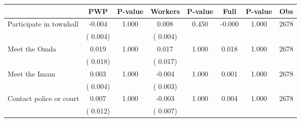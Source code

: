 
\begin{tabular}{l*{7}{c}}\hline&\multicolumn{1}{c}{PWP}&\multicolumn{1}{c}{P-value}&\multicolumn{1}{c}{Workers}&\multicolumn{1}{c}{P-value}&\multicolumn{1}{c}{Full}&\multicolumn{1}{c}{P-value}&\multicolumn{1}{c}{Obs} \\ \hline

 Participate in townhall       &             -0.004       &        1.000  &              0.008       &        0.450  &             -0.000       &              1.000 &  2678 \\ 
                       &       (       0.004)             &                               &       (       0.004)                     &                               &                                               &                                &                      \\ 

 Meet the Omda       &              0.019       &        1.000  &              0.017       &        1.000  &              0.018       &              1.000 &  2678 \\ 
                       &       (       0.018)             &                               &       (       0.017)                     &                               &                                               &                                &                      \\ 

 Meet the Imam       &              0.003       &        1.000  &             -0.004       &        1.000  &              0.001       &              1.000 &  2678 \\ 
                       &       (       0.004)             &                               &       (       0.003)                     &                               &                                               &                                &                      \\ 

 Contact police or court       &              0.007       &        1.000  &             -0.003       &        1.000  &              0.004       &              1.000 &  2678 \\ 
                       &       (       0.012)             &                               &       (       0.007)                     &                               &                                               &                                &                      \\ 


\end{tabular}
